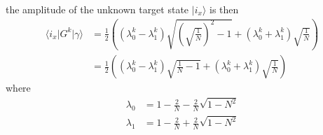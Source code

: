 the amplitude of the unknown target state $\vert i_{x} \rangle$ is then
\begin{align}
\langle i_{x} \vert G^{k} \vert \gamma \rangle &=
\frac{1}{2} 
\left(
\left(\lambda_0^k - \lambda_1^k \right)\sqrt{\left(\sqrt{\frac{1}{N}}\right)^2 - 1} + \left(\lambda_0^k + \lambda_1^k\right) \sqrt{\frac{1}{N}}
\right)\\
&=
\frac{1}{2} 
\left(
\left(\lambda_0^k - \lambda_1^k \right)\sqrt{\frac{1}{N} - 1} + \left(\lambda_0^k + \lambda_1^k\right) \sqrt{\frac{1}{N}}
\right)
\end{align}
where
\begin{align}
\lambda_0 &= 1 - \frac{2}{N} - \frac{2}{N}\sqrt{1-N^2}\\
\lambda_1 &= 1 - \frac{2}{N} + \frac{2}{N}\sqrt{1-N^2}
\end{align}


